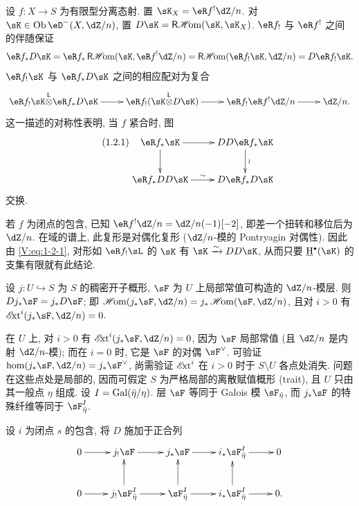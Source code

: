 设 $f:X\to S$ 为有限型分离态射. 置 $\sK_X=\eR f^!\dZ/n$.
对 $\sK\in \ob\eD^-(X,\dZ/n)$, 置 $D\sK = \rHom(\sK,\sK_X)$.
$\eR f_!$ 与 $\eR f^!$ 之间的伴随保证
\[
  \eR f_\ast D\sK = \eR f_\ast\rHom(\sK,\eR f^!\dZ/n)
    = \rHom(\eR f_!\sK,\dZ/n) = D\eR f_!\sK \text{.}
\]
$\eR f_!\sK$ 与 $\eR f_\ast D\sK$ 之间的相应配对为复合
\[\xymatrix{
  \eR f_! \sK\lotimes \eR f_\ast D\sK \ar[r]
    & \eR f_! (\sK\lotimes D\sK) \ar[r]
    & \eR f_! \eR f^! \dZ/n \ar[r]
    & \dZ/n \text{.}
}\]
这一描述的对称性表明, 当 $f$ 紧合时, 图
\begin{equation*}\tag{1.2.1}\label{V:eq:1-2-1}
\xymatrix{
  \eR f_\ast \sK \ar[r] \ar[d]
    & D D \eR f_\ast \sK \ar[d]^-\wr \\
  \eR f_\ast D D \sK \ar[r]^\sim
    & D\eR f_\ast D\sK
}
\end{equation*}
交换.

若 $f$ 为闭点的包含, 已知 $\eR f^!\dZ/n=\dZ/n(-1)[-2]$,
即差一个扭转和移位后为 $\dZ/n$.
在域的谱上, 此复形是对偶化复形 ($\dZ/n$-模的 Pontryagin 对偶性).
因此由 \eqref{V:eq:1-2-1}, 对形如 $\eR f_!\sL$ 的 $\sK$ 有 $\sK\iso D D\sK$,
从而只要 $\underline\h^\bullet(\sK)$ 的支集有限就有此结论.

\begin{theorem_}\label{V:1-3}
设 $j:U\hookrightarrow S$ 为 $S$ 的稠密开子概形,
$\sF$ 为 $U$ 上局部常值可构造的 $\dZ/n$-模层.
则 $D j_\ast \sF = j_\ast D \sF$; 即
$\Hom(j_\ast \sF,\dZ/n) = j_\ast\Hom(\sF,\dZ/n)$,
且对 $i>0$ 有 $\Ext^i(j_\ast\sF,\dZ/n) = 0$.
\end{theorem_}

在 $U$ 上, 对 $i>0$ 有 $\Ext^i(j_\ast\sF,\dZ/n)=0$,
因为 $\sF$ 局部常值 (且 $\dZ/n$ 是内射 $\dZ/n$-模);
而在 $i=0$ 时, 它是 $\sF$ 的对偶 $\sF^\vee$.
可验证 $\hom(j_\ast\sF,\dZ/n)=j_\ast\sF^\vee$,
尚需验证 $\operatorname{\mathscr{E}\!xt}^i$ 在 $i>0$ 时于 $S\setminus U$ 各点处消失.
问题在这些点处是局部的, 因而可假定 $S$ 为严格局部的离散赋值概形 (trait),
且 $U$ 只由其一般点 $\eta$ 组成.
设 $I=\operatorname{Gal}(\bar\eta/\eta)$. 层 $\sF$ 等同于 Galois 模 $\sF_{\bar\eta}$,
而 $j_\ast \sF$ 的特殊纤维等同于 $\sF_{\bar\eta}^I$.

设 $i$ 为闭点 $s$ 的包含, 将 $D$ 施加于正合列
\[\xymatrix{
  0 \ar[r]
    & j_! \sF \ar[r]
    & j_\ast \sF \ar[r]
    & i_\ast \sF_{\bar\eta}^I \ar[r]
    & 0 \\
  0 \ar[r]
    & j_! \sF_{\bar\eta}^I \ar[r] \ar[u]
    & \sF_{\bar\eta}^I \ar[r] \ar[u]
    & i_\ast \sF_{\bar\eta}^I \ar[r] \ar[u]
    & 0 \text{.}
}\]


